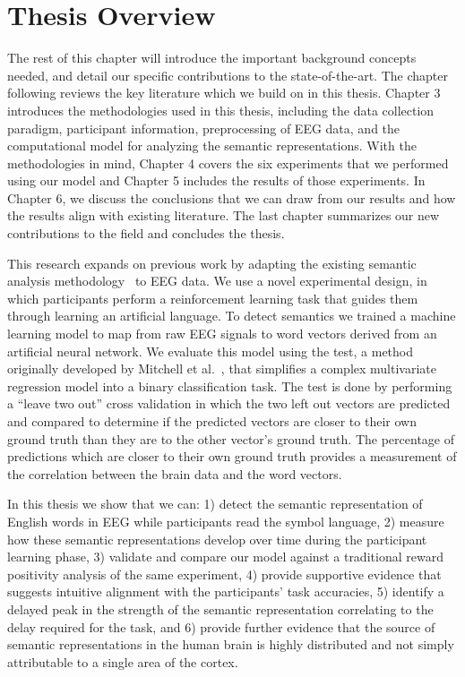 \section{Thesis Overview}

The rest of this chapter will introduce the important background concepts 
needed, and detail our specific contributions to the state-of-the-art. The 
chapter following reviews the key literature which we build on in this thesis.  
Chapter 3 introduces the methodologies used in this thesis, including the data 
collection paradigm, participant information, preprocessing of EEG data, and 
the computational model for analyzing the semantic representations. With the 
methodologies in mind, Chapter 4 covers the six experiments that we performed 
using our model and Chapter 5 includes the results of those experiments. In 
Chapter 6, we discuss the conclusions that we can draw from our results and how 
the results align with existing literature. The last chapter summarizes our new 
contributions to the field and concludes the thesis.

This research expands on previous work by adapting the existing semantic 
analysis methodology~\cite{Mitchell2008,Sudre2012} to EEG data.  We use a novel 
experimental design, in which participants perform a reinforcement learning 
task that guides them through learning an artificial language. To detect 
semantics we trained a machine learning model to map from raw EEG signals to 
word vectors derived from an artificial neural network. We evaluate this model 
using the \tvt test, a method originally developed by Mitchell et 
al.~\cite{Mitchell2008}, that simplifies a complex multivariate regression 
model into a binary classification task. The \tvt test is done by performing a 
``leave two out'' cross validation in which the two left out vectors are 
predicted and compared to determine if the predicted vectors are closer to 
their own ground truth than they are to the other vector's ground truth. The 
percentage of predictions which are closer to their own ground truth provides a 
measurement of the correlation between the brain data and the word vectors.

In this thesis we show that we can: 1) detect the semantic representation of 
English words in EEG while participants read the symbol language, 2) measure 
how these semantic representations develop over time during the participant 
learning phase, 3) validate and compare our model against a traditional reward 
positivity analysis of the same experiment, 4) provide supportive evidence that 
suggests intuitive alignment with the participants' task accuracies, 5) 
identify a delayed peak in the strength of the semantic representation 
correlating to the delay required for the task, and 6) provide further evidence 
that the source of semantic representations in the human brain is highly 
distributed and not simply attributable to a single area of the cortex.
